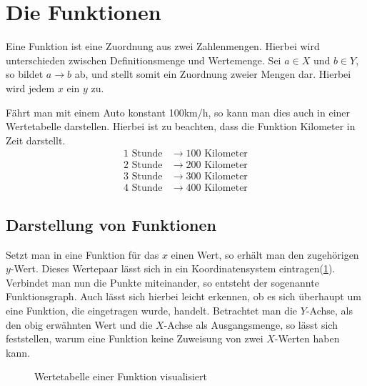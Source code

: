 \section{Die Funktionen}
Eine Funktion ist eine Zuordnung aus zwei Zahlenmengen. Hierbei wird unterschieden zwischen Definitionsmenge und Wertemenge. Sei $a\in X$ und $b\in Y$, so bildet $a\rightarrow b$ ab, und stellt somit ein Zuordnung zweier Mengen dar. Hierbei wird jedem $x$ ein $y$ zu. 

\begin{beispiel} Fährt man mit einem Auto konstant 100km/h, so kann man dies auch in einer Wertetabelle darstellen. Hierbei ist zu beachten, dass die Funktion Kilometer in Zeit darstellt.
\begin{align*}
	1 \text{ Stunde}&\rightarrow100 \text{ Kilometer}\\
	2 \text{ Stunde}&\rightarrow200 \text{ Kilometer}\\
	3 \text{ Stunde}&\rightarrow300 \text{ Kilometer}\\
	4 \text{ Stunde}&\rightarrow400 \text{ Kilometer}
\end{align*}
\end{beispiel}
\subsection{Darstellung von Funktionen}
Setzt man in eine Funktion für das $x$ einen Wert, so erhält man den zugehörigen $y$-Wert. Dieses Wertepaar lässt sich in ein Koordinatensystem eintragen(\ref{sec:Wertetabelle_einer_Funktion_visualisiert}). Verbindet man nun die Punkte miteinander, so entsteht der sogenannte Funktionsgraph. Auch lässt sich hierbei leicht erkennen, ob es sich überhaupt um eine Funktion, die eingetragen wurde, handelt. Betrachtet man die $Y$-Achse, als den obig erwähnten Wert und die $X$-Achse als Ausgangsmenge, so lässt sich feststellen, warum eine Funktion keine Zuweisung von zwei $X$-Werten haben kann.
\begin{figure}[h!]
\centering
{}
\caption{Wertetabelle einer Funktion visualisiert}
\label{sec:Wertetabelle_einer_Funktion_visualisiert}
\end{figure}

 
